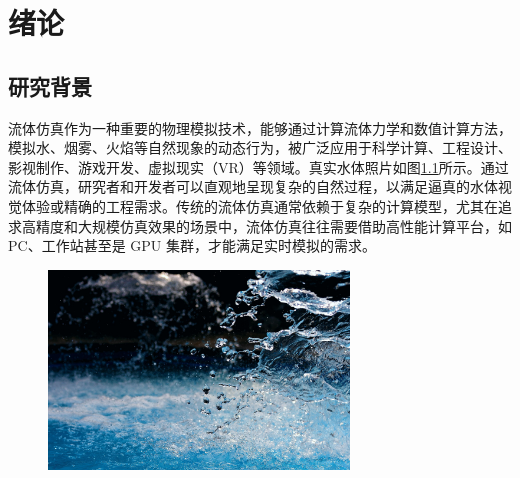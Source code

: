 
\chapter{绪论}

\section{研究背景}

\indent 流体仿真作为一种重要的物理模拟技术，能够通过计算流体力学和数值计算方法，模拟水、烟雾、火焰等自然现象的动态行为，被广泛应用于科学计算、工程设计、影视制作、游戏开发、虚拟现实（VR）等领域。真实水体照片如图\ref{fig:realwater}所示。通过流体仿真，研究者和开发者可以直观地呈现复杂的自然过程，以满足逼真的水体视觉体验或精确的工程需求。传统的流体仿真通常依赖于复杂的计算模型，尤其在追求高精度和大规模仿真效果的场景中，流体仿真往往需要借助高性能计算平台，如 PC、工作站甚至是 GPU 集群\cite{kipfer2004uberflow}，才能满足实时模拟的需求。


\begin{figure}[h]
 \centering
 \includegraphics[width=8cm]{image/nativeWater.jpg}
 \label{fig:realwater}  
\end{figure}


